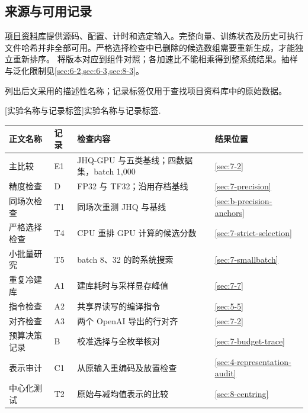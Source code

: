 \subsection{来源与可用记录}
\label{app:reproducibility}
\label{sec:b-artifacts}
\href{https://github.com/lrlorry/8800_report/blob/001579c9771759b672ef377b10dbc3dd959c7979/docs/artifact-access.md}{项目资料库}提供源码、配置、计时和选定输入。完整向量、训练状态及历史可执行文件哈希并非全部可用。严格选择检查中已删除的候选数组需要重新生成，才能独立重新排序。 将版本对应到组件对照；各加速比不能相乘得到整系统结果。抽样与泛化限制见\cref{sec:6-2,sec:6-3,sec:8-3}。

列出后文采用的描述性名称；记录标签仅用于查找项目资料库中的原始数据。

\par\medskip\noindent\begin{minipage}{\linewidth}
\centering\captionsetup{hypcap=false}
[实验名称与记录标签]{实验名称与记录标签.}
\label{tab:3-campaigns}
\footnotesize\setlength{\tabcolsep}{3pt}
\begin{tabularx}{\linewidth}{@{}>{\raggedright\arraybackslash}p{.24\linewidth}l>{\raggedright\arraybackslash}Xl@{}}
\toprule
正文名称 & 记录 & 检查内容 & 结果位置 \\
\midrule
主比较 & E1 & JHQ-GPU 与五类基线；四数据集，batch 1,000 & \cref{sec:7-2} \\
精度检查 & D & FP32 与 TF32；沿用存档基线 & \cref{sec:7-precision} \\
同场次检查 & T1 & 同场次重测 JHQ 与基线 & \cref{sec:b-precision-anchors} \\
严格选择检查 & T4 & CPU 重排 GPU 计算的候选分数 & \cref{sec:7-strict-selection} \\
小批量研究 & T5 & batch 8、32 的跨系统搜索 & \cref{sec:7-smallbatch} \\
重复冷建库 & A1 & 建库耗时与采样显存峰值 & \cref{sec:7-7} \\
指令检查 & A2 & 共享界读写的编译指令 & \cref{sec:5-5} \\
对齐检查 & A3 & 两个 OpenAI 导出的行对齐 & \cref{sec:7-2} \\
预算决策记录 & B & 校准选择与全枚举核对 & \cref{sec:7-budget-trace} \\
表示审计 & C1 & 从原输入重编码及放置检查 & \cref{sec:4-representation-audit} \\
中心化测试 & T2 & 原始与减均值表示的比较 & \cref{sec:8-centring} \\
\bottomrule
\end{tabularx}
\end{minipage}\par\medskip

